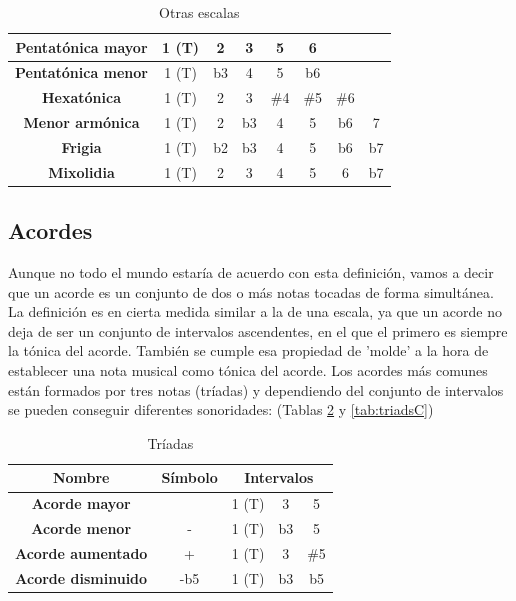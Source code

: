 \begin{table}[H]
    \centering
    \begin{tabular}{c|c|c|c|c|c|c|c}       
        \textbf{Pentatónica mayor} & 1 (T) & 2 & 3 & 5 & \multicolumn{1}{c}{6} \\
        \hline
        \textbf{Pentatónica menor} & 1 (T) & b3 & 4 & 5 & \multicolumn{1}{c}{b6} \\
        \hline
        \textbf{Hexatónica} & 1 (T) & 2 & 3 & \#4 & \#5 & \multicolumn{1}{c}{\#6}  \\
        \hline
        \textbf{Menor armónica} & 1 (T) & 2 & b3 & 4 & 5 & b6 & 7 \\ 
        \hline
        \textbf{Frigia} & 1 (T) & b2 & b3 & 4 & 5 & b6 & b7 \\
        \hline
        \textbf{Mixolidia} & 1 (T) & 2 & 3 & 4 & 5 & 6 & b7 \\             
    \end{tabular}
    \caption{Otras escalas}
    \label{tab:otras_escalas}
\end{table}

\subsection{Acordes}\label{sec:arm:acordes}

Aunque no todo el mundo estaría de acuerdo con esta definición, vamos a decir que un acorde es un conjunto de dos o más notas tocadas de forma simultánea. La definición es en cierta medida similar a la de una escala, ya que un acorde no deja de ser un conjunto de intervalos ascendentes, en el que el primero es siempre la tónica del acorde. También se cumple esa propiedad de 'molde' a la hora de establecer una nota musical como tónica del acorde. Los acordes más comunes están formados por tres notas (tríadas) y dependiendo del conjunto de intervalos se pueden conseguir diferentes sonoridades: (Tablas \ref{tab:triads} y \ref{tab:triadsC})

\begin{table}[h]
    \centering
    \begin{tabular}{c|c|c|c|c}       
        \textbf{Nombre} & \textbf{Símbolo} & \multicolumn{3}{c}{\textbf{Intervalos}} \\
        \hline
        \hline
        \textbf{Acorde mayor} & & 1 (T) & 3 & 5 \\
        \hline
        \textbf{Acorde menor} & - & 1 (T) & b3 & 5 \\
        \hline
        \textbf{Acorde aumentado} & + & 1 (T) & 3 & \#5 \\
        \hline
        \textbf{Acorde disminuido} & -b5 & 1 (T) & b3 & b5 \\
    \end{tabular}
    \caption{Tríadas}
    \label{tab:triads}
\end{table}

